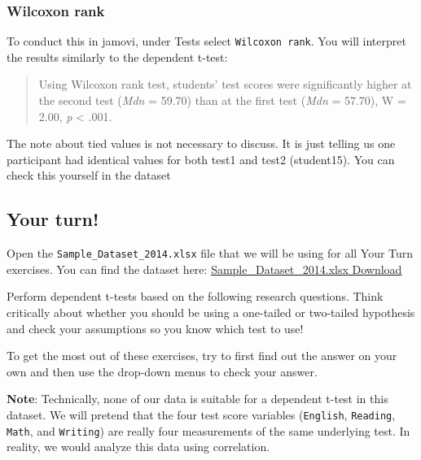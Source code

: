 \documentclass[
]{book}
\begin{document}
\hypertarget{wilcoxon-rank}{%
\subsubsection{Wilcoxon rank}\label{wilcoxon-rank}}

To conduct this in jamovi, under Tests select \texttt{Wilcoxon\ rank}. You will interpret the results similarly to the dependent t-test:

\begin{quote}
Using Wilcoxon rank test, students' test scores were significantly higher at the second test (\emph{Mdn} = 59.70) than at the first test (\emph{Mdn} = 57.70), W = 2.00, \emph{p} \textless{} .001.
\end{quote}

The note about tied values is not necessary to discuss. It is just telling us one participant had identical values for both test1 and test2 (student15). You can check this yourself in the dataset

\hypertarget{your-turn-2}{%
\subsection{Your turn!}\label{your-turn-2}}

Open the \texttt{Sample\_Dataset\_2014.xlsx} file that we will be using for all Your Turn exercises. You can find the dataset here: \href{https://github.com/danawanzer/stats-with-jamovi/blob/master/data/Sample_Dataset_2014.xlsx}{Sample\_Dataset\_2014.xlsx Download}

Perform dependent t-tests based on the following research questions. Think critically about whether you should be using a one-tailed or two-tailed hypothesis and check your assumptions so you know which test to use!

To get the most out of these exercises, try to first find out the answer on your own and then use the drop-down menus to check your answer.

\textbf{Note}: Technically, none of our data is suitable for a dependent t-test in this dataset. We will pretend that the four test score variables (\texttt{English}, \texttt{Reading}, \texttt{Math}, and \texttt{Writing}) are really four measurements of the same underlying test. In reality, we would analyze this data using correlation.
\end{document}
